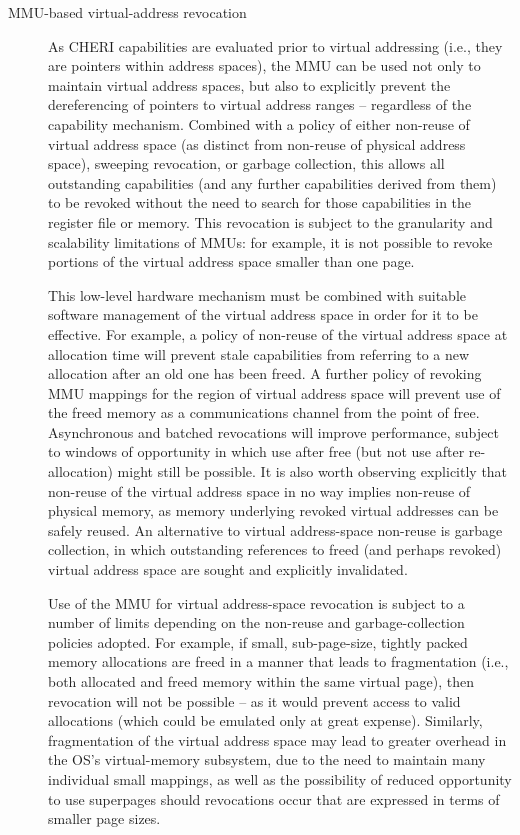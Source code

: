 \begin{description}
\item[MMU-based virtual-address revocation]
  As CHERI capabilities are evaluated prior to virtual addressing (i.e., they
  are pointers within address spaces), the MMU can be used not only to
  maintain virtual address spaces, but also to explicitly prevent the
  dereferencing of pointers to virtual address ranges -- regardless of the
  capability mechanism.
  Combined with a policy of either non-reuse of virtual address space (as
  distinct from non-reuse of physical address space), sweeping revocation, or
  garbage collection, this
  allows all outstanding capabilities (and any further capabilities derived
  from them) to be revoked without the need to search for those capabilities
  in the register file or memory.
  This revocation is subject to the granularity and scalability limitations
  of MMUs: for example, it is not possible to revoke portions of the virtual
  address space smaller than one page.

  This low-level hardware mechanism must be combined with suitable software
  management of the virtual address space in order for it to be effective.
  For example, a policy of non-reuse of the virtual address space at
  allocation time will prevent stale capabilities from referring to a new
  allocation after an old one has been freed.
  A further policy of revoking MMU mappings for the region of virtual address
  space will prevent use of the freed memory as a communications channel from
  the point of free.
  Asynchronous and batched revocations will improve performance, subject to
  windows of opportunity in which use after free (but not use after
  re-allocation) might still be possible.
  It is also worth observing explicitly that non-reuse of the virtual address
  space in no way implies non-reuse of physical memory, as memory underlying
  revoked virtual addresses can be safely reused.
  An alternative to virtual address-space non-reuse is garbage collection, in
  which outstanding references to freed (and perhaps revoked) virtual address
  space are sought and explicitly invalidated.

  Use of the MMU for virtual address-space revocation is subject to a number
  of limits depending on the non-reuse and garbage-collection policies
  adopted.
  For example, if small, sub-page-size, tightly packed memory allocations
  are freed in a manner that leads to fragmentation (i.e., both allocated and
  freed memory within the same virtual page), then revocation will not be
  possible -- as it would prevent access to valid allocations (which could be
  emulated only at great expense).
  Similarly, fragmentation of the virtual address space may lead to greater
  overhead in the OS's virtual-memory subsystem, due to the need to maintain
  many individual small mappings, as well as the possibility of reduced
  opportunity to use superpages should revocations occur that are expressed
  in terms of smaller page sizes.


\end{description}
